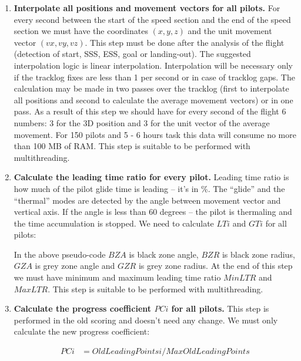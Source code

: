 \documentclass[gap.tex]{subfiles}
\begin{document}
\begin{enumerate}
    \item \textbf{Interpolate all positions and movement vectors for all
        pilots.}  For every second between the start of the speed section and
        the end of the speed section we must have the coordinates \((x, y, z)\)
        and the unit movement vector \((vx, vy, vz)\). This step must be done
        after the analysis of the flight (detection of start, SSS, ESS, goal or
        landing-out). The suggested interpolation logic is linear
        interpolation. Interpolation will be necessary only if the tracklog
        fixes are less than 1 per second or in case of tracklog gaps. The
        calculation may be made in two passes over the tracklog (first to
        interpolate all positions and second to calculate the average movement
        vectors) or in one pass. As a result of this step we should have for
        every second of the flight 6 numbers: 3 for the 3D position and 3 for
        the unit vector of the average movement. For 150 pilots and 5 - 6 hours
        task this data will consume no more than 100 MB of RAM. This step is
        suitable to be performed with multithreading.

    \item \textbf{Calculate the leading time ratio for every pilot.} Leading
        time ratio is how much of the pilot glide time is leading – it’s in \%.
        The “glide” and the “thermal” modes are detected by the angle between
        movement vector and vertical axis. If the angle is less than 60 degrees
        – the pilot is thermaling and the time accumulation is stopped. We need
        to calculate \(LTi\) and \(GTi\) for all pilots:

        In the above pseudo-code \(BZA\) is black zone angle, \(BZR\) is black
        zone radius, \(GZA\) is grey zone angle and \(GZR\) is grey zone
        radius. At the end of this step we must have minimum and maximum
        leading time ratio \(MinLTR\) and \(MaxLTR\). This step is suitable to
        be performed with multithreading.

    \item \textbf{Calculate the progress coefficient \(PCi\) for all pilots.}
        This step is performed in the old scoring and doesn’t need any change.
        We must only calculate the new progress coefficient:
        
        \begin{align*}
            PCi &= OldLeadingPointsi / MaxOldLeadingPoints
        \end{align*}


\end{enumerate}
\end{document}
